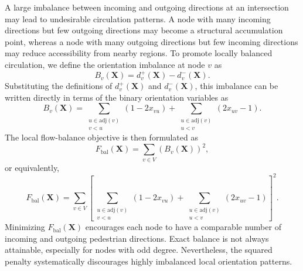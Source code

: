 \documentclass[twocolumn,a4paper]{article} %
\begin{document}
A large imbalance between incoming and outgoing directions at an intersection may lead to undesirable circulation patterns. A node with many incoming directions but few outgoing directions may become a structural accumulation point, whereas a node with many outgoing directions but few incoming directions may reduce accessibility from nearby regions. To promote locally balanced circulation, we define the orientation imbalance at node \(v\) as
\begin{equation}
    B_v(\mathbf{X})
    =
    d_v^{+}(\mathbf{X})-d_v^{-}(\mathbf{X}).
\end{equation}
Substituting the definitions of \(d_v^{+}(\mathbf{X})\) and \(d_v^{-}(\mathbf{X})\), this imbalance can be written directly in terms of the binary orientation variables as
\begin{equation}
    B_v(\mathbf{X})
    =
    \sum_{\substack{u\in \mathrm{adj}(v)\\v<u}}
    (1-2x_{vu})
    +
    \sum_{\substack{u\in \mathrm{adj}(v)\\u<v}}
    (2x_{uv}-1).
\end{equation}
The local flow-balance objective is then formulated as
\begin{equation}
    F_{\mathrm{bal}}(\mathbf{X})
    =
    \sum_{v\in V}
    \left(
    B_v(\mathbf{X})
    \right)^2,
\end{equation}
or equivalently,
\begin{equation}
    F_{\mathrm{bal}}(\mathbf{X})
    =
    \sum_{v\in V}
    \left[
    \sum_{\substack{u\in \mathrm{adj}(v)\\v<u}}
    (1-2x_{vu})
    +
    \sum_{\substack{u\in \mathrm{adj}(v)\\u<v}}
    (2x_{uv}-1)
    \right]^2.
\end{equation}
Minimizing \(F_{\mathrm{bal}}(\mathbf{X})\) encourages each node to have a comparable number of incoming and outgoing pedestrian directions. Exact balance is not always attainable, especially for nodes with odd degree. Nevertheless, the squared penalty systematically discourages highly imbalanced local orientation patterns.
\end{document}
